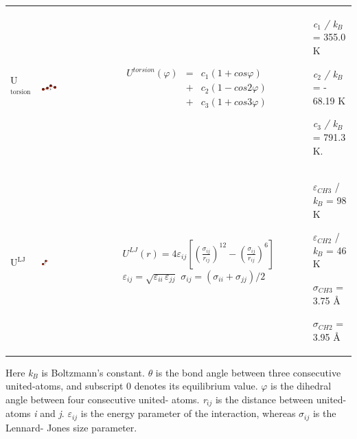 \documentclass{scrbook}
\begin{document}
\begin{table}
\begin{tabularx}{\textwidth}{
p{}
p{}
p{}
p{}}
U$^{\mathrm{torsion}}$ & \includegraphics[width=0.2\textwidth]{gfx/image32.png} & 
$\begin{array}{ccc}
U^{torsion}\left(\varphi\right) & = & c_{1}\left(1+cos\varphi\right)\\
 & + & c_{2}\left(1-cos2\varphi\right)\\
 & + & c_{3}\left(1+cos3\varphi\right)
\end{array}$
                       & \textit{c}$_{1}$ \textit{/ k}$_{B}$ = 355.0 K \par \textit{c}$_{2}$ \textit{/ k}$_{B}$ = - 68.19 K \par \textit{c}$_{3}$ \textit{/ k}$_{B}$ = 791.3 K. \\
U$^{\mathrm{LJ}}$ & \includegraphics[width=0.08\textwidth]{gfx/image34.png} & 
$U^{LJ}\left(r\right)=4\varepsilon_{ij}\left[\left(\frac{\sigma_{ij}}{r_{ij}}\right)^{12}-\left(\frac{\sigma_{ij}}{r_{ij}}\right)^{6}\right]$
$\varepsilon_{ij}=\sqrt{\varepsilon_{ii}\,\varepsilon_{jj}}$
$\sigma_{ij}=\left(\sigma_{ii}+\sigma_{jj}\right)/2$
                  & ${\varepsilon}$$_{CH3}$ / \textit{k}$_{B}$ = 98 K \par ${\varepsilon}$$_{CH2}$ / \textit{k}$_{B}$ = 46 K \par ${\sigma}$$_{CH3}$ = 3.75 \AA{}  \par ${\sigma}$$_{CH2}$ = 3.95 \AA{} \\
\end{tabularx}
\end{table}

Here \textit{k}$_{B}$ is Boltzmann's constant. ${\theta}$ is the bond angle between
three consecutive united-atoms, and subscript 0 denotes its equilibrium value.
${\varphi}$ is the dihedral angle between four consecutive united- atoms.
\textit{r}$_{ij}$ is the distance between united-atoms \textit{i} and
\textit{j}. ${\varepsilon}$$_{ij}$ is the energy parameter of the interaction,
whereas ${\sigma}$$_{ij}$ is the Lennard- Jones size parameter. 
\end{document}
